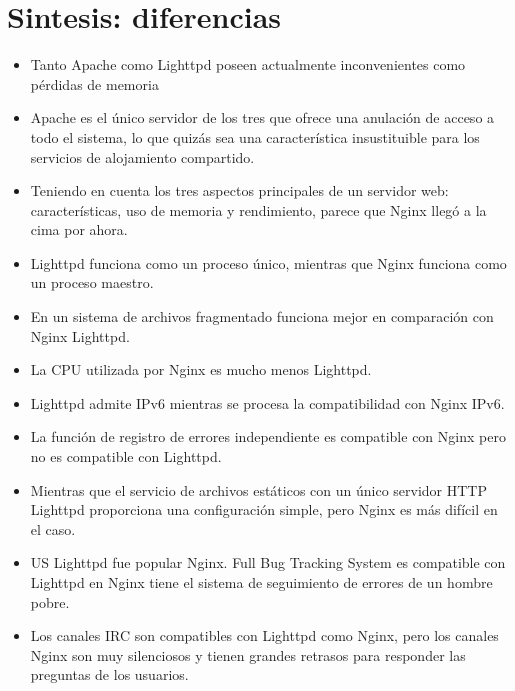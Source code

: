 \documentclass{article}
\begin{document}
\section{Sintesis: diferencias}
\begin{itemize}

\item Tanto Apache como Lighttpd poseen actualmente inconvenientes como pérdidas de memoria

\item Apache es el único servidor de los tres que ofrece una anulación de acceso a todo el sistema, lo que quizás sea una característica insustituible para los servicios de alojamiento compartido.

\item Teniendo en cuenta los tres aspectos principales de un servidor web: características, uso de memoria y rendimiento, parece que Nginx llegó a la cima por ahora.

\item Lighttpd funciona como un proceso único, mientras que Nginx funciona como un proceso maestro.

\item  En un sistema de archivos fragmentado funciona mejor en comparación con Nginx Lighttpd.

\item La CPU utilizada por Nginx es mucho menos Lighttpd.

\item Lighttpd admite IPv6 mientras se procesa la compatibilidad con Nginx IPv6.

\item  La función de registro de errores independiente es compatible con Nginx pero no es compatible con Lighttpd.

\item Mientras que el servicio de archivos estáticos con un único servidor HTTP Lighttpd proporciona una configuración simple, pero Nginx es más difícil en el caso.

\item US Lighttpd fue popular Nginx. Full Bug Tracking System es compatible con Lighttpd en Nginx tiene el sistema de seguimiento de errores de un hombre pobre.

\item	Los canales IRC son compatibles con Lighttpd como Nginx, pero los canales Nginx son muy silenciosos y tienen grandes retrasos para responder las preguntas de los usuarios.
\end{itemize}
\end{document}
